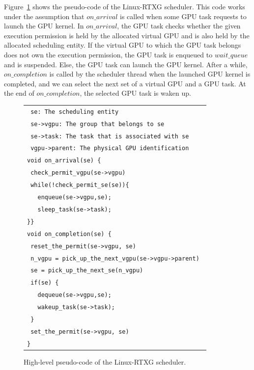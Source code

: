 Figure~\ref{fig:scheduling} shows the pseudo-code of the Linux-RTXG
scheduler.
This code works under the assumption that $on\_arrival$ is called when
some GPU task requests to launch the GPU kernel.
In $on\_arrival$, the GPU task checks whether the given execution
permission is held by the allocated virtual GPU and is also held by the
allocated scheduling entity.
If the virtual GPU to which the GPU task belongs does not own the
execution permission, the GPU task is enqueued to $wait\_queue$ and is
suspended.
Else, the GPU task can launch the GPU kernel.
After a while, $on\_completion$ is called by the scheduler thread when
the launched GPU kernel is completed, and we can select the next set of
a virtual GPU and a GPU task. 
At the end of $on\_completion$, the selected GPU task is waken up.

\begin{figure}[!t]
\begin{center}
\begin{tabular}{l}
\hline
{\scriptsize \verb| se: The scheduling entity |}\\
{\scriptsize \verb| se->vgpu: The group that belongs to se|}\\
{\scriptsize \verb| se->task: The task that is associated with se |}\\
{\scriptsize \verb| vgpu->parent: The physical GPU identification|}\\
\hline
{\scriptsize \verb|void on_arrival(se) {|}\\
{\scriptsize \verb| check_permit_vgpu(se->vgpu)    |}\\
{\scriptsize \verb| while(!check_permit_se(se)){|}\\
{\scriptsize \verb|   enqueue(se->vgpu,se); |}\\
{\scriptsize \verb|   sleep_task(se->task); |}\\
{\scriptsize \verb|}}|}\\
{\scriptsize \verb|void on_completion(se) {|}\\
{\scriptsize \verb| reset_the_permit(se->vgpu, se)|}\\
{\scriptsize \verb| n_vgpu = pick_up_the_next_vgpu(se->vgpu->parent) |}\\
{\scriptsize \verb| se = pick_up_the_next_se(n_vgpu)|}\\
{\scriptsize \verb| if(se) {|}\\
{\scriptsize \verb|   dequeue(se->vgpu,se);|}\\
{\scriptsize \verb|   wakeup_task(se->task);|}\\
{\scriptsize \verb| }|}\\
{\scriptsize \verb| set_the_permit(se->vgpu, se)|}\\
{\scriptsize \verb|}|}\\
\hline
\end{tabular}
\caption{High-level pseudo-code of the Linux-RTXG scheduler.}
\label{fig:scheduling}
\end{center}
\end{figure}

